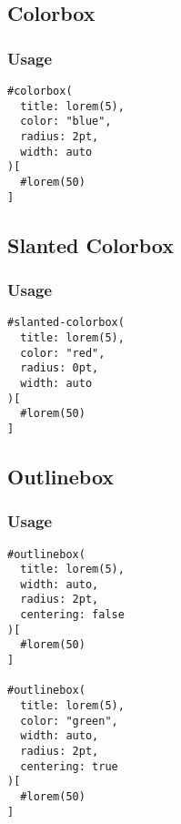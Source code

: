 \subsection{Colorbox}\label{colorbox}


\subsubsection{Usage}\label{usage}

\begin{verbatim}
#colorbox(
  title: lorem(5),
  color: "blue",
  radius: 2pt,
  width: auto
)[
  #lorem(50)
]
\end{verbatim}

\subsection{Slanted Colorbox}\label{slanted-colorbox}


\subsubsection{Usage}\label{usage-1}

\begin{verbatim}
#slanted-colorbox(
  title: lorem(5),
  color: "red",
  radius: 0pt,
  width: auto
)[
  #lorem(50)
]
\end{verbatim}

\subsection{Outlinebox}\label{outlinebox}


\subsubsection{Usage}\label{usage-2}

\begin{verbatim}
#outlinebox(
  title: lorem(5),
  width: auto,
  radius: 2pt,
  centering: false
)[
  #lorem(50)
]

#outlinebox(
  title: lorem(5),
  color: "green",
  width: auto,
  radius: 2pt,
  centering: true
)[
  #lorem(50)
]
\end{verbatim}

